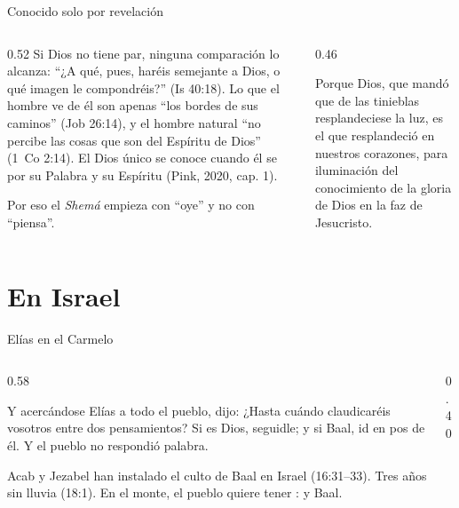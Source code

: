 \begin{frame}{Conocido solo por revelación}
\begin{columns}[c,onlytextwidth]
\begin{column}{0.52\textwidth}\small
Si Dios no tiene par, ninguna comparación lo alcanza: ``¿A qué, pues, haréis semejante a Dios, o qué imagen le compondréis?'' (Is 40:18). Lo que el hombre ve de él son apenas ``los bordes de sus caminos'' (Job 26:14), y el hombre natural ``no percibe las cosas que son del Espíritu de Dios'' (1~Co 2:14). El Dios único se conoce cuando él se  por su Palabra y su Espíritu (Pink, 2020, cap. 1).\par\smallskip
Por eso el \emph{Shemá} empieza con ``oye'' y no con ``piensa''.
\end{column}
\begin{column}{0.46\textwidth}
\begin{cita}[fontupper=\scriptsize\itshape]Porque Dios, que mandó que de las tinieblas resplandeciese la luz, es el que resplandeció en nuestros corazones, para iluminación del conocimiento de la gloria de Dios en la faz de Jesucristo.\end{cita}
\end{column}
\end{columns}\par\smallskip
{}
\end{frame}

\section{En Israel}

\begin{frame}{Elías en el Carmelo}
\begin{columns}[c,onlytextwidth]
\begin{column}{0.58\textwidth}
\begin{center}\scriptsize{}\end{center}
\begin{cita}[fontupper=\scriptsize\itshape]Y acercándose Elías a todo el pueblo, dijo: ¿Hasta cuándo claudicaréis vosotros entre dos pensamientos? Si \SENOR{} es Dios, seguidle; y si Baal, id en pos de él. Y el pueblo no respondió palabra.\end{cita}
\small Acab y Jezabel han instalado el culto de Baal en Israel (16:31--33). Tres años sin lluvia (18:1). En el monte, el pueblo quiere tener : \SENOR{} y Baal.
\end{column}
\begin{column}{0.40\textwidth}\end{column}
\end{columns}
\end{frame}

